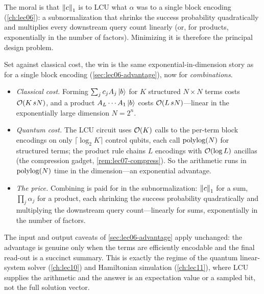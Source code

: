 The moral is that $\left\lVert c \right\rVert_1$ is to LCU what $\alpha$ was to a single block encoding
(\cref{ch:lec06}): a subnormalization that shrinks the success probability
quadratically and multiplies every downstream query count linearly (or, for
products, exponentially in the number of factors). Minimizing it is therefore the
principal design problem.

\begin{remark}
\label{rem:lec07-advantage}
Set against classical cost, the win is the same exponential-in-dimension story as for
a single block encoding (\cref{sec:lec06-advantage}), now for \emph{combinations}.
\begin{itemize}[leftmargin=1.4em,nosep]
  \item \emph{Classical cost.} Forming $\sum_{j} c_j A_j\ket{b}$ for $K$ structured
        $N\times N$ terms costs $\mathcal{O}(K\,sN)$, and a product $A_L\cdots A_1\ket{b}$
        costs $\mathcal{O}(L\,sN)$---linear in the exponentially large dimension $N=2^n$.
  \item \emph{Quantum cost.} The LCU circuit uses $\mathcal{O}(K)$ calls to the per-term
        block encodings on only $\lceil\log_2 K\rceil$ control qubits, each call
        $\operatorname{polylog}(N)$ for structured terms; the product rule chains $L$ encodings with
        $\mathcal{O}(\log L)$ ancillas (the compression gadget, \cref{rem:lec07-compress}).
        So the arithmetic runs in $\operatorname{polylog}(N)$ time in the dimension---an exponential
        advantage.
  \item \emph{The price.} Combining is paid for in the subnormalization: $\left\lVert c \right\rVert_1$
        for a sum, $\prod_j\alpha_j$ for a product, each shrinking the success
        probability quadratically and multiplying the downstream query count---linearly
        for sums, exponentially in the number of factors.
\end{itemize}
The input and output caveats of \cref{sec:lec06-advantage} apply unchanged: the
advantage is genuine only when the terms are efficiently encodable and the final
read-out is a succinct summary. This is exactly the regime of the quantum
linear-system solver (\cref{ch:lec10}) and Hamiltonian simulation (\cref{ch:lec11}),
where LCU supplies the arithmetic and the answer is an expectation value or a sampled
bit, not the full solution vector.
\end{remark}

